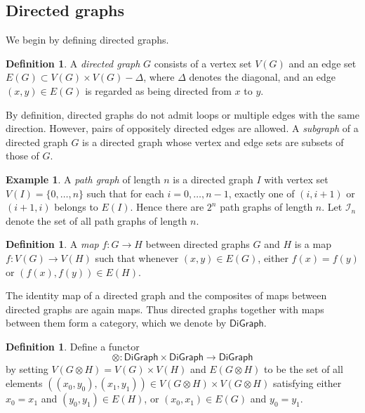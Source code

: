 \documentclass[oneside, 12pt]{amsart}
\numberwithin{equation}{section}
\theoremstyle{plain}
\theoremstyle{definition}
\newtheorem{definition}[theorem]{Definition}
\newtheorem{example}[theorem]{Example}
\theoremstyle{remark}
\begin{document}
	
	
	\subsection{Directed graphs}
	
	We begin by defining directed graphs.
	
	
	
	\begin{definition}
		A \emph{directed graph} $G$ consists of a vertex set $V(G)$ and an edge set $E(G)\subset V(G)\times V(G)-\Delta$, where $\Delta$ denotes the diagonal, and an edge $(x,y)\in E(G)$ is regarded as being directed from $x$ to $y$.
	\end{definition}
	
	
	
	By definition, directed graphs do not admit loops or multiple edges with the same direction. However, pairs of oppositely directed edges are allowed. A \emph{subgraph} of a directed graph $G$ is a directed graph whose vertex and edge sets are subsets of those of $G$. %
	
	
	
	\begin{example}
		A \emph{path graph} of length $n$ is a directed graph $I$ with vertex set $V(I)=\{0,\ldots,n\}$ such that for each $i=0,\ldots,n-1$, exactly one of $(i,i+1)$ or $(i+1,i)$ belongs to $E(I)$. Hence there are $2^n$ path graphs of length $n$. Let $\mathcal{I}_n$ denote the set of all path graphs of length $n$.
	\end{example}
	
	
	
	\begin{definition}
		A \emph{map} $f\colon G\to H$ between directed graphs $G$ and $H$ is a map $f\colon V(G)\to V(H)$ such that  whenever $(x,y)\in E(G)$, either $f(x)=f(y)$ or $(f(x),f(y))\in E(H)$.
	\end{definition}
	
	
	
	The identity map of a directed graph and the composites of maps between directed graphs are again maps. Thus directed graphs together with maps between them form a category, which we denote by $\mathsf{DiGraph}$.
	
	
	
	\begin{definition}
		Define a functor
		\[
		\otimes\colon\mathsf{DiGraph}\times\mathsf{DiGraph}\to\mathsf{DiGraph}
		\]
		by setting $V(G\otimes H)=V(G)\times V(H)$ and $E(G\otimes H)$ to be the set of all elements $((x_0,y_0),(x_1,y_1))\in V(G\otimes H)\times V(G\otimes H)$ satisfying either $x_0=x_1$ and $(y_0,y_1)\in E(H)$, or $(x_0,x_1)\in E(G)$ and $y_0=y_1$.
	\end{definition}
	
\end{document}
